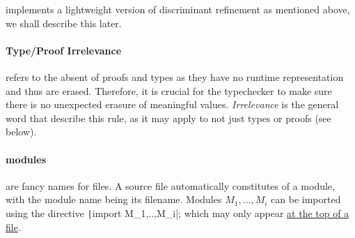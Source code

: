 \documentclass[a4paper, 11pt]{article}
\theoremstyle{remark}\newtheorem*{remark}{Remark}
\theoremstyle{definition}\newtheorem*{definition}{Definition}
\begin{document}
\Tigrisd implements a lightweight version of discriminant refinement as mentioned above, we shall describe this later.

\paragraph{Type/Proof Irrelevance} refers to the absent of proofs and types as they
have no runtime representation and thus are erased. Therefore, it is crucial for the typechecker
to make sure there is no unexpected erasure of meaningful values. \emph{Irrelevance} is the general
word that describe this rule, as it may apply to not just types or proofs (see below).

\paragraph{modules} are fancy names for files. A \Tigrisd source file automatically constitutes of
a module, with the module name being its filename.
Modules $M_1,\dots,M_i$ can be imported using the directive \texttt|import M_1,..,M_i|; which
may only appear \underline{at the top of a file}.
\end{document}
